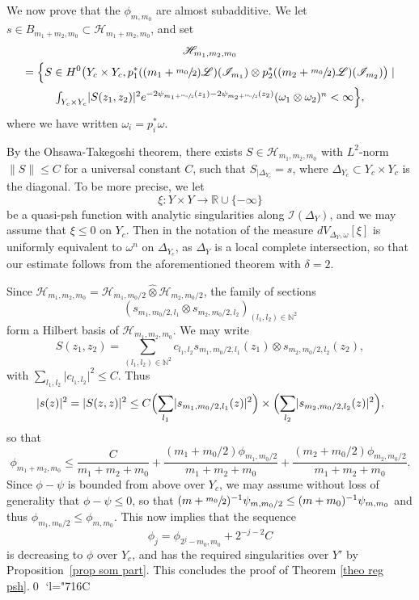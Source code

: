 \documentclass[JEP,XML,SOM,Unicode,published]{cedram}
\newcommand{\Changelback}{\mathcode`l="716C}
\let\ts\textstyle
\let\sep\mid
\theoremstyle{definition}
\newcommand \N{\mathbb N}
\newcommand \R{\mathbb R}
\newcommand \Ld {\mathscr {L}}
\let\de\Delta
\begin{document}
We now prove that the $\phi_{m, m_0}$ are almost subadditive. We let $s \in B_{m_1+m_2, m_0} \subset \mathscr{H}_{m_1+m_2, m_0}$, and set
\begin{multline*}
\mathscr{H}_{m_1, m_2, m_0}\\
= \Bigl\{ S \in H^0 \bigl(Y_c \times Y_c, p_1^*((m_1+\sfrac{m_0}{2})\Ld)(\mathscr{I}_{m_1}) \otimes p_2^*((m_2+\sfrac{m_0}{2})\Ld)(\mathscr{I}_{m_2}) \bigr) \sep
\\
\ts\int_{Y_c \times Y_c} \lvert S(z_1, z_2) \rvert^2 e^{-2\psi_{m_1 + \sfrac{m_0}{2}}(z_1)-2\psi_{m_2 + \sfrac{m_0}{2}}(z_2)}(\omega_1 \otimes \omega_2)^{n} < \infty \Bigr\},
\end{multline*}
where we have written $\omega_i = p_i^*\omega$.

By the Ohsawa-Takegoshi theorem, there exists $S \in \mathscr{H}_{m_1, m_2, m_0}$ with $L^2$-norm $\lVert S \rVert \le C$ for a universal constant $C$, such that $S_{| \de_{Y_c}} =s$, where $\de_{Y_c} \subset Y_c \times Y_c$ is the diagonal. To be more precise, we let
\[
\xi: Y \times Y \to \R \cup \{ - \infty \}
\]
be a quasi-psh function with analytic singularities along $\mathscr{I}(\de_Y)$, and we may assume that $\xi \le 0$ on $Y_c$. Then in the notation of \cite[Th.\,1.4]{DemOT} the measure $dV_{\de_Y, \omega}[\xi]$ is uniformly equivalent to $\omega^n$ on $\de_{Y_c}$, as $\de_Y$ is a local complete intersection, so that our estimate follows from the aforementioned theorem with $\delta =2$.

Since $\mathscr{H}_{m_1, m_2, m_0} = \mathscr{H}_{m_1, m_0/2} \hat{\otimes} \mathscr{H}_{m_2, m_0/2}$, the family of sections
\[
(s_{m_1, m_0/2, l_1} \otimes s_{m_2, m_0/2, l_2})_{(l_1,l_2) \in \N^2}
\]
form a Hilbert basis of $\mathscr{H}_{m_1, m_2, m_0}$. We may write
\[
S(z_1, z_2) = \sum_{(l_1, l_2) \in \N^2} c_{l_1,l_2} s_{m_1, m_0/2, l_1}(z_1) \otimes s_{m_2, m_0/2, l_2}(z_2),
\]
with $\sum_{l_1, l_2} \lvert c_{l_1,l_2} \rvert^2 \le C$. Thus
\[
\lvert s(z) \rvert^2=\lvert S(z, z)\rvert^2 \le C \Bigl(\sum_{l_1} \lvert s_{m_1, m_0/2, l_1}(z) \rvert^2 \Bigr) \times \Bigl(\sum_{l_2} \lvert s_{m_2, m_0/2, l_2}(z) \rvert^2 \Bigr),
\]
so that
\[
\phi_{m_1+m_2, m_0} \le \frac{C}{m_1+m_2+m_0} + \frac{(m_1+m_0/2) \phi_{m_1, m_0/2}}{ m_1+m_2+ m_0} + \frac{(m_2+m_0/2) \phi_{m_2, m_0/2}}{ m_1+m_2+ m_0}.
\]
Since $\phi - \psi$ is bounded from above over $Y_c$, we may assume without loss of generality that $\phi - \psi \le 0$, so that $(m+ \sfrac{m_0}{2})^{-1} \psi_{m, m_0/2} \le (m+m_0)^{-1} \psi_{m, m_0}$ and thus $\phi_{m_1, m_0/2} \le \phi_{m, m_0}$. This now implies that the sequence
\[
\phi_j = \phi_{2^j -m_0, m_0} + 2^{-j-2} C
\]
is decreasing to $\phi$ over $Y_c$, and has the required singularities over $Y'$ by Proposition~\ref{prop som part}. This concludes the proof of Theorem \ref{theo reg psh}.\qed
\Changelback

\backmatter


\end{document}
